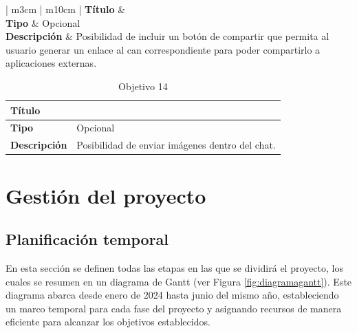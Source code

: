 \documentclass[a4paper, 12pt]{article}
\begin{document}
\begin{table}[H]
	\captionsetup{width=0.95\linewidth}%
   	\captionsetup{singlelinecheck=false}%
	\captionsetup{list=no}%
	\captionsetup{font=bf}
	\captionsetup{labelformat=empty}
	\caption*{Objetivo 13}
	\begin{tabular}{ | m{3cm} | m{10cm} | }
		\hline {}\textbf{Título} &  \textcolor{white}{\textit{Compartición de caninos a través de un enlace}}  \\ \hline
		\textbf{Tipo} & Opcional \\ \hline
		\textbf{Descripción} & Posibilidad de incluir un botón de compartir que permita al usuario generar un enlace al can correspondiente para poder compartirlo a aplicaciones externas. \\ \hline
	\end{tabular}
\end{table}  

\begin{table}[H]
	\captionsetup{width=0.95\linewidth}%
   	\captionsetup{singlelinecheck=false}%
	\captionsetup{list=no}%
	\captionsetup{font=bf}
	\captionsetup{labelformat=empty}
	\caption*{Objetivo 14}
	\begin{tabular}{ | m{3cm} | m{10cm} | }
		\hline \cellcolor{lightgray}\textbf{Título} & \cellcolor{gray} \textcolor{white}{\textit{Envío de imágenes dentro del chat}}  \\ \hline
		\cellcolor{lightgray}\textbf{Tipo} & Opcional \\ \hline
		\cellcolor{lightgray}\textbf{Descripción} & Posibilidad de enviar imágenes dentro del chat. \\ \hline
	\end{tabular}
\end{table} 

\newpage
\section{Gestión del proyecto}
\subsection{Planificación temporal}
En esta sección se definen todas las etapas en las que se dividirá el proyecto, los cuales se resumen en un diagrama de Gantt (ver Figura  \ref{fig:diagramagantt}). Este diagrama abarca desde enero de 2024 hasta junio del mismo año, estableciendo un marco temporal para cada fase del proyecto y asignando recursos de manera eficiente para alcanzar los objetivos establecidos.
\end{document}
